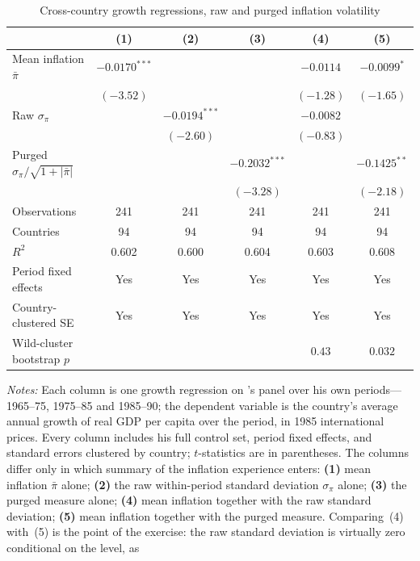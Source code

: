 \begin{table}[tp]
\centering
\caption{Cross-country growth regressions, raw and purged inflation volatility}
\label{tab:crosscountry}
\begin{tabular}{lccccc}
\toprule
 & (1) & (2) & (3) & (4) & (5) \\
\midrule
Mean inflation $\bar\pi$ & $-0.0170^{***}$ &  &  & $-0.0114$ & $-0.0099^{*}$ \\
 & $(-3.52)$ &  &  & $(-1.28)$ & $(-1.65)$ \\
Raw $\sigma_\pi$ &  & $-0.0194^{***}$ &  & $-0.0082$ &  \\
 &  & $(-2.60)$ &  & $(-0.83)$ &  \\
Purged $\sigma_\pi/\sqrt{1+|\bar\pi|}$ &  &  & $-0.2032^{***}$ &  & $-0.1425^{**}$ \\
 &  &  & $(-3.28)$ &  & $(-2.18)$ \\
\midrule
Observations & 241 & 241 & 241 & 241 & 241 \\
Countries & 94 & 94 & 94 & 94 & 94 \\
$R^2$ & 0.602 & 0.600 & 0.604 & 0.603 & 0.608 \\
Period fixed effects & Yes & Yes & Yes & Yes & Yes \\
Country-clustered SE & Yes & Yes & Yes & Yes & Yes \\
Wild-cluster bootstrap $p$ &  &  &  & $0.43$ & $0.032$ \\
\bottomrule
\end{tabular}
\vspace{0.2em}
\begin{minipage}{0.90\linewidth}\footnotesize
\textit{Notes:} Each column is one growth regression on \citeauthor{barro1995inflation}'s panel
over his own periods---1965--75, 1975--85 and 1985--90; the dependent variable is the country's
average annual growth of real GDP per capita over the period, in 1985 international prices. Every
column includes his full control set, period fixed effects, and standard errors clustered by
country; $t$-statistics are in parentheses. The columns differ only in which summary of the
inflation experience enters: \textbf{(1)} mean inflation $\bar\pi$ alone; \textbf{(2)} the raw
within-period standard deviation $\sigma_\pi$ alone; \textbf{(3)} the purged measure alone;
\textbf{(4)} mean inflation together with the raw standard deviation; \textbf{(5)} mean inflation
together with the purged measure. Comparing~(4) with~(5) is the point of the exercise: the raw
standard deviation is virtually zero conditional on the level, as \citeauthor{barro1995inflation}

\end{minipage}
\end{table}
